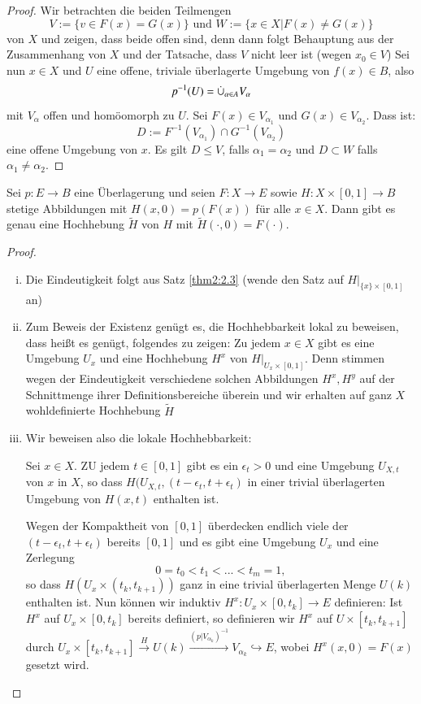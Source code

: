 \documentclass[a4paper,10pt]{scrartcl}
\begin{document}
\begin{proof}
 Wir betrachten die beiden Teilmengen
\[
 V:=\{v\in F(x)=G(x)\} \text{ und } W:=\{x\in X|F(x)\neq G(x)\}
\]
von $X$ und zeigen, dass beide offen sind, denn dann folgt Behauptung aus der Zusammenhang von $X$ und der Tatsache, dass $V$ nicht leer ist (wegen $x_0\in V$) Sei nun $x\in X$ und $U$ eine offene, triviale überlagerte Umgebung von $f(x)\in B$, also
\[
 p^{-1}(U)=\mathbin{\dot{\cup}}_{\alpha\in A} V_\alpha
\]
mit $V_\alpha$ offen und homöomorph zu $U$. Sei $F(x)\in V_{\alpha_1}$ und $G(x)\in V_{\alpha_2}$. Dass ist:
\[
 D:=F^{-1}(V_{\alpha_1})\cap G^{-1}(V_{\alpha_2})
\]
eine offene Umgebung von $x$. Es gilt $D\le V$, falls $\alpha_1=\alpha_2$ und $D\subset W$ falls $\alpha_1\neq \alpha_2$.
\end{proof}
\begin{st} \label{thm:2.4}
 Sei $p: E\to B$ eine Überlagerung und seien $F: X \to E$ sowie $H: X\times [0,1] \to B$ stetige Abbildungen mit $H(x,0)=p(F(x))$ für alle $x\in X$. Dann gibt es genau eine Hochhebung $\tilde H$ von $H$ mit $\tilde H(\cdot, 0)=F(\cdot)$.
\end{st}
\begin{proof}
 \begin{enumerate}[(i)]
  \item Die Eindeutigkeit folgt aus Satz \ref{thm2:2.3} (wende den Satz auf $H|_{\{x\}\times[0,1]}$ an)
  \item Zum Beweis der Existenz genügt es, die Hochhebbarkeit lokal zu beweisen, dass heißt es genügt, folgendes zu zeigen:
\fixme[fig73]
Zu jedem $x\in X$ gibt es eine Umgebung $U_x$ und eine Hochhebung $H^x$ von $H|_{U_x\times[0,1]}$. Denn stimmen wegen der Eindeutigkeit verschiedene solchen Abbildungen $H^x, H^y$ auf der Schnittmenge ihrer Definitionsbereiche überein und wir erhalten auf ganz $X$ wohldefinierte Hochhebung $\tilde H$
\item Wir beweisen also die lokale Hochhebbarkeit: 

Sei $x\in X$. ZU jedem $t\in[0,1]$ gibt es ein $\epsilon_t>0$ und eine Umgebung $U_{X,t}$ von $x$ in $X$, so dass $H(U_{X,t}, (t-\epsilon_t, t+ \epsilon_t)$ in einer trivial überlagerten Umgebung von $H(x,t)$ enthalten ist.

Wegen der Kompaktheit von $[0,1]$ überdecken endlich viele der $(t-\epsilon_t, t+\epsilon_t)$ bereits $[0,1]$ und es gibt eine Umgebung $U_x$ und eine Zerlegung
\[
 0=t_0<t_1<...<t_m=1,
\]
so dass $H(U_x\times (t_k, t_{k+1}))$ ganz in eine trivial überlagerten Menge $U(k)$ enthalten ist. Nun können wir induktiv $H^x: U_{x}\times [0,t_k] \to E$ definieren: Ist $H^x$ auf $U_x\times [0,t_k]$ bereits definiert, so definieren wir $H^x$ auf $U\times[t_k,t_{k+1}]$ durch $U_x\times [t_k, t_{k+1}]\stackrel{H}{\to} U(k) \stackrel{(p|V_{\alpha_k})^{-1}}\to V_{\alpha_k}\hookrightarrow E$, wobei $H^x(x,0)=F(x)$ gesetzt wird.
 \end{enumerate}

\end{proof}
\end{document}
